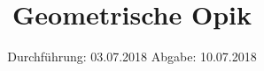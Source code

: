 

\subject{408}
\title{Geometrische Opik}
\date{%
  Durchführung: 03.07.2018
  \hspace{3em}
  Abgabe: 10.07.2018
}



\maketitle
\thispagestyle{empty}
\tableofcontents
\newpage






\printbibliography{}


